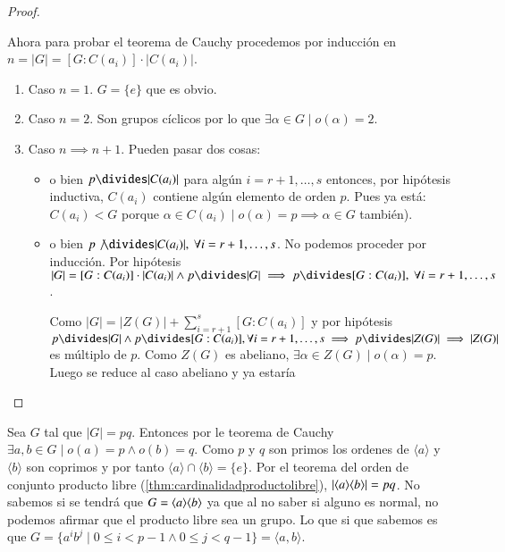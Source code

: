 \begin{proof}
\begin{itemize}
		Ahora para probar el teorema de Cauchy procedemos por inducción en $n = |G| = [G:C(a_i)]\cdot |C(a_i)|$.
		
		\begin{enumerate}
			\item Caso $n = 1$. $G = \{e\}$ que es obvio.
			\item Caso $n = 2$. Son grupos cíclicos por lo que $\exists \alpha \in G \mid o(\alpha) = 2$.
			\item Caso $n \implies n+1$. Pueden pasar dos cosas:
			\begin{itemize}
				\item o bien $p \divides |C(a_i)|$ para algún $i = r+1, \dots, s$ entonces, por hipótesis inductiva, $C(a_i)$ contiene algún elemento de orden $p$. Pues ya está: $C(a_i) < G$ porque $\alpha \in C(a_i) \mid o(\alpha) = p \implies \alpha \in G$ también). \qedsymbol
				
				\item o bien $p \not\divides |C(a_i)|,\ \forall i = r+1,\dots,s$. No podemos proceder por inducción. Por hipótesis $|G| = [G:C(a_i)]\cdot |C(a_i)| \land p \divides |G| \implies p \divides [G: C(a_i)],\ \forall i = r+1,\dots, s$.
				
				Como $|G| = |Z(G)| + \sum_{i = r + 1}^{s} [G : C(a_i)]$ y por hipótesis $p \divides |G| \land p \divides [G : C(a_i)], \forall i = r+1,\dots,s \implies p \divides |Z(G)| \implies |Z(G)|$ es múltiplo de $p$. Como $Z(G)$ es abeliano, $\exists \alpha \in Z(G) \mid o(\alpha) = p$. Luego se reduce al caso abeliano y ya estaría \qedhere
			\end{itemize}
		\end{enumerate}
	\end{itemize}
\end{proof}

\begin{ej}
	Sea $G$ tal que $|G| = pq$. Entonces por le teorema de Cauchy $\exists a,b \in G \mid o(a) = p \land o(b) = q$. Como $p$ y $q$ son primos los ordenes de $\langle a \rangle$ y $\langle b \rangle$ son coprimos y por tanto $\langle a \rangle \cap \langle b \rangle = \{e\}$. Por el teorema del orden de conjunto producto libre (\ref{thm:cardinalidadproductolibre}), $|\langle a\rangle \langle b\rangle| = pq$. No sabemos si se tendrá que $G = \langle a\rangle\langle b\rangle$ ya que al no saber si alguno es normal, no podemos afirmar que el producto libre sea un grupo. Lo que si que sabemos es que $G = \{a^ib^j \mid 0 \leq i < p -1 \land 0 \leq j < q - 1\} = \langle a, b \rangle$.
\end{ej}

